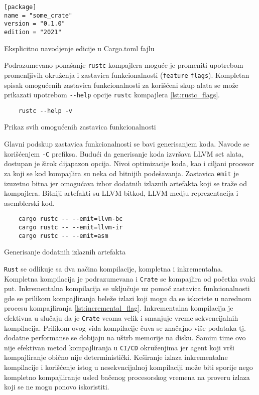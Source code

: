 \begin{listing}[h]
\begin{verbatim}
[package]
name = "some_crate"
version = "0.1.0"
edition = "2021"

\end{verbatim}
\caption{Eksplicitno navodjenje edicije u Cargo.toml fajlu}
\label{lst:edition_toml}
\end{listing}

\newpage


Podrazumevano ponašanje \verb|rustc| kompajlera moguće je promeniti upotrebom promenljivih okruženja 
i zastavica funkcionalnosti (\verb|feature| \verb|flags|). Kompletan spisak omogućenih zastavica funkcionalnosti 
za korišćeni skup alata se može prikazati upotrebom \verb|--help| opcije \verb|rustc| kompajlera \ref{lst:rustc_flags}.

\begin{listing}[H]
\begin{verbatim}
    rustc --help -v 
\end{verbatim}
\caption{Prikaz svih omogućenih zastavica funkcionalnosti}
\label{lst:rustc_flags}
\end{listing}

Glavni podskup zastavica funkcionalnosti se bavi generisanjem koda. Navode se korišćenjem \verb|-C| prefiksa. 
Budući da generisanje koda izvršava 
LLVM set alata, dostupan je širok dijapazon opcija. Nivoi optimizacije koda, kao i ciljani procesor za koji 
se kod kompajlira su neka od bitnijih podešavanja. Zastavica \verb|emit| je izuzetno bitna jer omogućava izbor 
dodatnih izlaznih artefakta koji se traže od kompajlera. Bitniji artefakti su LLVM bitkod, LLVM medju 
reprezentacija i asemblerski kod.

\begin{listing}[H]
\begin{verbatim}
    cargo rustc -- --emit=llvm-bc
    cargo rustc -- --emit=llvm-ir
    cargo rustc -- --emit=asm
\end{verbatim}
\caption{Generisanje dodatnih izlaznih artefakta}
\label{lst:emit_flag}
\end{listing}


\verb|Rust| se odlikuje sa dva načina kompilacije, kompletna 
i inkrementalna. Kompletna kompilacija je podrazumevana i \verb|Crate| se kompajlira od početka svaki put.
Inkrementalna kompilacija se uključuje uz pomoć zastavica funkcionalnosti gde se prilikom kompajliranja 
beleže izlazi koji mogu da se iskoriste u narednom procesu kompajliranja \ref{lst:incremental_flag}. Inkrementalna kompilacija je 
efektivna u slučaju da je \verb|Crate| veoma velik i smanjuje vreme sekvencijalnih kompilacija. Prilikom ovog 
vida kompilacije čuva se značajno više podataka tj. dodatne performanse se dobijaju na uštrb memorije na disku.
Samim time ovo nije efektivan metod kompajliranja u \verb|CI/CD| okruženjima jer agent koji vrši kompajliranje
obično nije deterministički. Keširanje izlaza inkrementalne kompilacije i korišćenje istog u nesekvncijalnoj 
kompilaciji može biti sporije nego kompletno kompajliranje usled bačenog procesorskog vremena na proveru 
izlaza koji se ne mogu ponovo iskoristiti.

